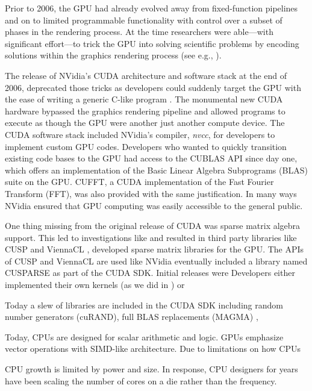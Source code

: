 \documentclass{report}
\begin{document}
Prior to 2006, the GPU had already evolved away from fixed-function pipelines and on to limited programmable functionality with control over a subset of phases in the rendering process. At the time researchers were able---with significant effort---to trick the GPU into solving scientific problems by encoding solutions within the graphics rendering process (see e.g., \cite{Harris2005,Owens2007}). 

The release of NVidia's CUDA architecture and software stack at the end of 2006, deprecated those tricks as developers could suddenly target the GPU with the ease of writing a generic C-like program \cite{CudaGuide2011}. The monumental new CUDA hardware bypassed the graphics rendering pipeline and allowed programs to execute as though the GPU were another just another compute device. The CUDA software stack included NVidia's compiler, \emph{nvcc}, for developers to implement custom GPU codes. Developers who wanted to quickly transition existing code bases to the GPU had access to the CUBLAS API since day one, which offers an implementation of the Basic Linear Algebra Subprograms (BLAS) suite on the GPU. CUFFT, a CUDA implementation of the Fast Fourier Transform (FFT), was also provided with the same justification. In many ways NVidia ensured that GPU computing was easily accessible to the general public. 


One thing missing from the original release of CUDA was sparse matrix algebra support. 
This led to investigations like \cite{Bell2009,SuKeutzer2012,} and resulted in third party libraries like CUSP \cite{Cusp2012} and ViennaCL \cite{Rupp2010,Rupp2010a}, developed sparse matrix libraries for the GPU. The APIs of CUSP and ViennaCL are used like 
NVidia eventually included a library named CUSPARSE as part of the CUDA SDK. Initial releases were 
Developers either implemented their own kernels (as we did in \cite{BolligFlyerErlebacher2012}) or   



Today a slew of libraries are included in the CUDA SDK including random number generators (cuRAND), full BLAS replacements (MAGMA) , 


Today, CPUs are designed for scalar arithmetic and logic. GPUs emphasize vector operations with SIMD-like architecture. 
Due to limitations on how CPUs 

CPU growth is limited by power and size. In response, CPU designers for years have been scaling the number of cores on a die rather than the frequency. 
\end{document}
